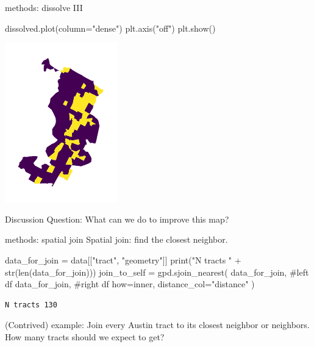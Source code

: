 \documentclass[
  ignorenonframetext,
]{beamer}
\newenvironment{Shaded}{\begin{snugshade}}{\end{snugshade}}
\newcommand{\BuiltInTok}[1]{\textcolor[rgb]{0.00,0.23,0.31}{#1}}
\newcommand{\CommentTok}[1]{\textcolor[rgb]{0.37,0.37,0.37}{#1}}
\newcommand{\NormalTok}[1]{\textcolor[rgb]{0.00,0.23,0.31}{#1}}
\newcommand{\OperatorTok}[1]{\textcolor[rgb]{0.37,0.37,0.37}{#1}}
\newcommand{\StringTok}[1]{\textcolor[rgb]{0.13,0.47,0.30}{#1}}
\begin{document}
\begin{frame}[fragile]{methods: dissolve III}
\label{methods-dissolve-iii}
\begin{Shaded}
\begin{Highlighting}[]
\NormalTok{dissolved.plot(column}\OperatorTok{=}\StringTok{"dense"}\NormalTok{)}
\NormalTok{plt.axis(}\StringTok{"off"}\NormalTok{)}
\NormalTok{plt.show()}
\end{Highlighting}
\end{Shaded}

\includegraphics{spatial_2_files/figure-beamer/cell-27-output-1.pdf}

Discussion Question: What can we do to improve this map?
\end{frame}

\begin{frame}[fragile]{methods: spatial join}
\label{methods-spatial-join}
Spatial join: find the closest neighbor.

\begin{Shaded}
\begin{Highlighting}[]
\NormalTok{data\_for\_join }\OperatorTok{=}\NormalTok{ data[[}\StringTok{"tract"}\NormalTok{, }\StringTok{"geometry"}\NormalTok{]]}
\BuiltInTok{print}\NormalTok{(}\StringTok{"N tracts "} \OperatorTok{+} \BuiltInTok{str}\NormalTok{(}\BuiltInTok{len}\NormalTok{(data\_for\_join)))}
\NormalTok{join\_to\_self }\OperatorTok{=}\NormalTok{ gpd.sjoin\_nearest(}
\NormalTok{    data\_for\_join,  }\CommentTok{\#left df}
\NormalTok{    data\_for\_join, }\CommentTok{\#right df}
\NormalTok{    how}\OperatorTok{=}\StringTok{\textquotesingle{}inner\textquotesingle{}}\NormalTok{, }
\NormalTok{    distance\_col}\OperatorTok{=}\StringTok{"distance"}
\NormalTok{)}
\end{Highlighting}
\end{Shaded}

\begin{verbatim}
N tracts 130
\end{verbatim}

(Contrived) example: Join every Austin tract to its closest neighbor or
neighbors. How many tracts should we expect to get?
\end{frame}
\end{document}
